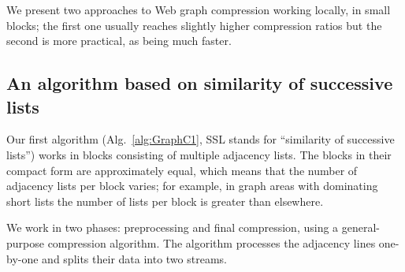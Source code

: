 \documentclass[envcountsame]{llncs}
\begin{document}
We present two approaches to Web graph compression working locally, in small 
blocks; the first one usually reaches slightly higher compression ratios 
but the second is more practical, as being much faster.

\subsection{An algorithm based on similarity of successive lists}
\label{sec:fa}


Our first algorithm (Alg.~\ref{alg:GraphC1}, SSL stands for ``similarity of successive 
lists'') works in blocks consisting of multiple adjacency lists. The blocks in their 
compact form are approximately equal, which means that the number of adjacency lists 
per block varies; for example, in graph areas with dominating short lists the number 
of lists per block is greater than elsewhere.

We work in two phases: preprocessing and final compression, using a general-purpose 
compression algorithm. The algorithm processes the adjacency lines one-by-one and 
splits their data into two streams. 
\end{document}
